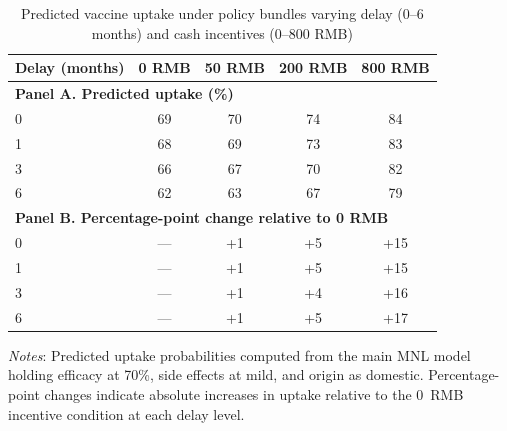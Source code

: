 \begin{table}[htbp]
\centering
\footnotesize
\begin{threeparttable}
\caption{Predicted vaccine uptake under policy bundles varying delay (0--6 months) and cash incentives (0--800 RMB)}
\label{tab:counterfactual_uptake}

\begin{tabular}{lcccc}
\toprule
\textbf{Delay (months)} & \textbf{0 RMB} & \textbf{50 RMB} & \textbf{200 RMB} & \textbf{800 RMB} \\
\midrule
\multicolumn{5}{l}{\textbf{Panel A. Predicted uptake (\%)}} \\
\midrule
0 & 69 & 70 & 74 & 84 \\
1 & 68 & 69 & 73 & 83 \\
3 & 66 & 67 & 70 & 82 \\
6 & 62 & 63 & 67 & 79 \\
\midrule
\multicolumn{5}{l}{\textbf{Panel B. Percentage-point change relative to 0 RMB}} \\
\midrule
0 & --- & +1 & +5  & +15 \\
1 & --- & +1 & +5  & +15 \\
3 & --- & +1 & +4  & +16 \\
6 & --- & +1 & +5  & +17 \\
\bottomrule
\end{tabular}

\begin{tablenotes}[flushleft]
\footnotesize
\item \textit{Notes}: Predicted uptake probabilities computed from the main MNL model holding efficacy at 70\%, side effects at mild, and origin as domestic. Percentage-point changes indicate absolute increases in uptake relative to the 0~RMB incentive condition at each delay level.
\end{tablenotes}

\end{threeparttable}
\end{table}



